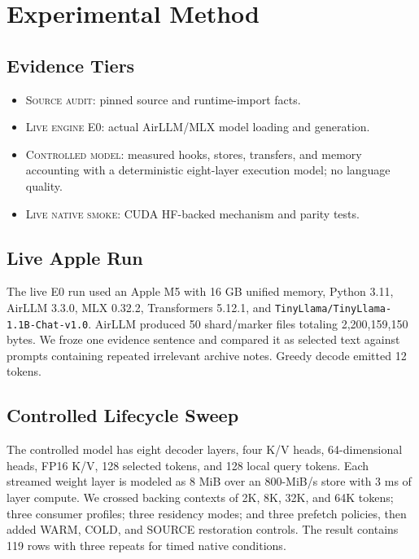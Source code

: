 \documentclass[10pt]{article}
\newcommand{\evidence}[1]{\textcolor{black!65}{\textsc{#1}}}
\begin{document}
\section{Experimental Method}

\subsection{Evidence Tiers}

\begin{itemize}
\item \evidence{Source audit}: pinned source and runtime-import facts.
\item \evidence{Live engine E0}: actual AirLLM/MLX model loading and generation.
\item \evidence{Controlled model}: measured hooks, stores, transfers, and memory
accounting with a deterministic eight-layer execution model; no language quality.
\item \evidence{Live native smoke}: CUDA HF-backed mechanism and parity tests.
\end{itemize}

\subsection{Live Apple Run}

The live E0 run used an Apple M5 with 16 GB unified memory, Python 3.11,
AirLLM 3.3.0, MLX 0.32.2, Transformers 5.12.1, and
\texttt{TinyLlama/TinyLlama-1.1B-Chat-v1.0}. AirLLM produced 50 shard/marker
files totaling 2,200,159,150 bytes. We froze one evidence sentence and compared
it as selected text against prompts containing repeated irrelevant archive notes.
Greedy decode emitted 12 tokens.

\subsection{Controlled Lifecycle Sweep}

The controlled model has eight decoder layers, four K/V heads, 64-dimensional
heads, FP16 K/V, 128 selected tokens, and 128 local query tokens. Each streamed
weight layer is modeled as 8 MiB over an 800-MiB/s store with 3 ms of layer
compute. We crossed backing contexts of 2K, 8K, 32K, and 64K tokens; three
consumer profiles; three residency modes; and three prefetch policies, then
added WARM, COLD, and SOURCE restoration controls. The result contains 119 rows
with three repeats for timed native conditions.
\end{document}

